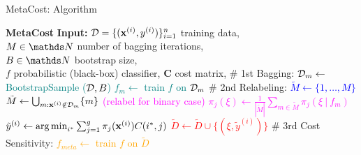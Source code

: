 \documentclass[11pt,compress,t,notes=noshow, xcolor=table]{beamer}
\begin{document}
\begin{vbframe}{MetaCost: Algorithm}
{\begin{minipage}{0.45\textwidth}
\begin{algorithmic}
				\tiny
%				
				\State \textbf{MetaCost}  
				\State \textbf{Input:} 
				$\mathcal{D} = \{(\mathbf{x}^{(i)},y^{(i)})\}_{i=1}^n$ training data, \\
				$M \in \N$ number of bagging iterations, \\
				$B \in \N$ bootstrap size, \\
				$f$ probabilistic (black-box) classifier, 
				$\mathbf{C}$ cost matrix, 
				\State \# 1st Bagging:
				\textcolor{teal}{
					\State $\mathcal{D}_m  \leftarrow $ BootstrapSample ($\mathcal{D},B$)
					\State $f_m  \leftarrow $ train $f$ on $\mathcal{D}_m$
				\EndFor}
				\State \# 2nd Relabeling:
				\textcolor{blue}{
						\State $\tilde M \leftarrow \{1,\ldots,M\}$
					\Else
						\State $\tilde M \leftarrow \bigcup_{m: \mathbf{x}^{(i)} \notin \mathcal{D}_m} \{m\}$
					\EndIf}
					\textcolor{magenta}{ (relabel for binary case)
						\State $\pi_j(\xi)  \leftarrow \frac{1}{|\tilde M| } \sum_{m \in \tilde M}   \pi_j(\xi~|~ f_m) $
					\EndFor}
                        \textcolor{red}{\State $\tilde y^{(i)} \leftarrow \operatorname{arg\,min}_{i^*} \sum_{j=1}^g \pi_j(\mathbf{x}^{(i)}) C(i^*,j) $
					\State $\tilde D \leftarrow \tilde D \cup \{(\xi,\tilde y^{(i)})\} $
				\EndFor}
				\State \# 3rd Cost Sensitivity:
%				
				\textcolor{orange}{\State $f_{meta} \leftarrow$ train $f$ on $\tilde D$}
%			
			\end{algorithmic}
		\end{minipage}
	}
\end{vbframe}




\end{document}
